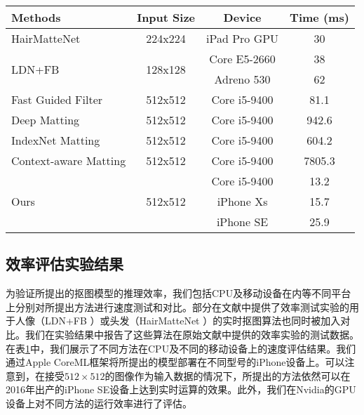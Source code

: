 \begin{table}[t]
	\setlength{\tabcolsep}{8pt}
	\centering
	\begin{tabular}{lccc}  
		\toprule
		Methods  & Input Size&  Device & Time (ms)   \\
		\midrule\midrule
		HairMatteNet\cite{levinshtein2018real}& 224x224& iPad Pro GPU & 30   \\
		\midrule
		\multirow{2}{*}{LDN+FB\cite{zhu2017fast}} &\multirow{2}{*}{128x128}  &  Core E5-2660 & 38  \\
		&&  Adreno 530 & 62  \\
		\midrule
		\midrule
		Fast Guided Filter\cite{he2015fast} &512x512 & Core i5-9400 & 81.1  \\
		\midrule
		Deep Matting\cite{xu2017deep}& 512x512& Core i5-9400 & 942.6  \\
		\midrule
		IndexNet Matting\cite{lu2019indices} &512x512	& Core i5-9400 & 604.2  \\
		\midrule
		Context-aware Matting\cite{hou2019context}& 512x512	& Core i5-9400 & 7805.3  \\
		\midrule
		\multirow{3}{*}{Ours} &\multirow{3}{*}{512x512}& Core i5-9400 & 13.2  \\
		&& iPhone Xs   & 15.7  \\
		&& iPhone SE  & 25.9   \\
		\bottomrule
	\end{tabular}
	\label{tab6:time_mobie}
\end{table}

\subsection{效率评估实验结果}
为验证所提出的抠图模型的推理效率，我们包括CPU及移动设备在内等不同平台上分别对所提出方法进行速度测试和对比。部分在文献中提供了效率测试实验的用于人像（LDN+FB \cite{zhu2017fast}）或头发（HairMatteNet \cite{levinshtein2018real}）的实时抠图算法也同时被加入对比。我们在实验结果中报告了这些算法在原始文献中提供的效率实验的测试数据。在表\ref{tab6:time_mobie}中，我们展示了不同方法在CPU及不同的移动设备上的速度评估结果。我们通过Apple CoreML框架将所提出的模型部署在不同型号的iPhone设备上。可以注意到，在接受$512\times512$的图像作为输入数据的情况下，所提出的方法依然可以在2016年出产的iPhone SE设备上达到实时运算的效果。此外，我们在Nvidia的GPU设备上对不同方法的运行效率进行了评估。

